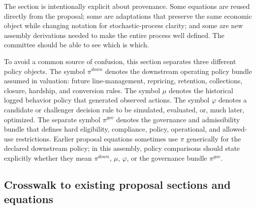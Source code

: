 \documentclass[11pt]{article}
\newcommand{\1}{\mathbf{1}}
\begin{document}
The section is intentionally explicit about provenance. Some equations are
reused directly from the proposal; some are adaptations that preserve the same
economic object while changing notation for stochastic-process clarity; and some
are new assembly derivations needed to make the entire process well defined. The
committee should be able to see which is which.

To avoid a common source of confusion, this section separates three different
policy objects. The symbol $\pi^{down}$ denotes the downstream operating policy
bundle assumed in valuation: future line-management, repricing, retention,
collections, closure, hardship, and conversion rules. The symbol $\mu$ denotes
the historical logged behavior policy that generated observed actions. The
symbol $\varphi$ denotes a candidate or challenger decision rule to be simulated,
evaluated, or, much later, optimized. The separate symbol $\pi^{gov}$ denotes
the governance and admissibility bundle that defines hard eligibility,
compliance, policy, operational, and allowed-use restrictions. Earlier proposal
equations sometimes use $\pi$ generically for the declared downstream policy; in
this assembly, policy comparisons should state explicitly whether they mean
$\pi^{down}$, $\mu$, $\varphi$, or the governance bundle $\pi^{gov}$.

\subsection{Crosswalk to existing proposal sections and equations}
\label{subsec:state-space-crosswalk}
\end{document}
